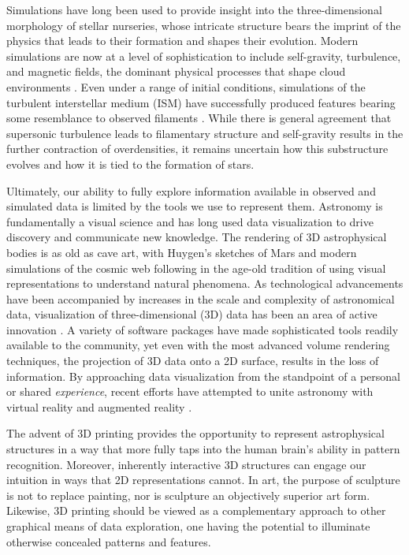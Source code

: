 \documentclass[twocolumn]{aastex63}
\begin{document}
Simulations have long been used to provide insight into the three-dimensional morphology of stellar nurseries, whose intricate structure bears the imprint of the physics that leads to their formation and shapes their evolution.   Modern simulations are now at a level of sophistication to include self-gravity, turbulence, and magnetic fields, the dominant physical processes that shape cloud environments \citep[e.g.,][]{Vazquez-Semadeni_1994, Klessen_2001, Banerjee_2006,Girichidis_2012, Federrath_2013}.  Even under a range of initial conditions, simulations of the turbulent interstellar medium (ISM) have successfully produced features bearing some resemblance to observed filaments \citep[e.g.,][]{Smith_2014, Kirk_2015, Federrath_2021}.  While there is general agreement that supersonic turbulence leads to filamentary structure and self-gravity results in the further contraction of overdensities, it remains uncertain how this substructure evolves and how it is tied to the formation of stars.
 
Ultimately, our ability to fully explore information available in observed and simulated data is limited by the tools we use to represent them.  Astronomy is fundamentally a visual science and has long used data visualization to drive discovery and communicate new knowledge.  The rendering of 3D astrophysical bodies is as old as cave art, with Huygen’s sketches of Mars and modern simulations of the cosmic web following in the age-old tradition of using visual representations to understand natural phenomena.  As technological advancements have been accompanied by increases in the scale and complexity of astronomical data, visualization of three-dimensional (3D) data has been an area of active innovation  \cite[e.g.,][]{Punzo_2015, Naiman_2017, Kent_2019}.  A variety of software packages have made sophisticated tools readily available to the community, yet even with the most advanced volume rendering techniques, the projection of 3D data onto a 2D surface, results in the loss of information. By approaching data visualization from the standpoint of a personal or shared \textit{experience}, recent efforts have attempted to unite astronomy with virtual reality and augmented reality \citep[e.g.,][]{Vogt_2013, Arcand_2018, Orlando_2019}.  
 
The advent of 3D printing provides the opportunity to represent astrophysical structures in a way that more fully taps into the human brain’s ability in pattern recognition.  Moreover, inherently interactive 3D structures can engage our intuition in ways that 2D representations cannot. In art, the purpose of sculpture is not to replace painting, nor is sculpture an objectively superior art form.  Likewise, 3D printing should be viewed as a complementary approach to other graphical means of data exploration, one having the potential to illuminate otherwise concealed patterns and features. 
\end{document}

